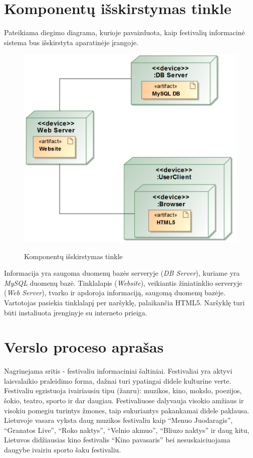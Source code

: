 ﻿\documentclass{VUMIFPSkursinis}
\begin{document}
\section{Komponentų išskirstymas tinkle}
Pateikiama diegimo diagrama, kurioje pavaizduota, kaip festivalių informacinė sistema bus išskirstyta aparatinėje įrangoje. 
\begin{figure}[H]
\centering
    \includegraphics[scale=0.5]{img/PSI3/deploy.PNG}
	\label{uml:22}
	\caption{Komponentų išskirstymas tinkle}
\end{figure}
Informacija yra saugoma duomenų bazės serveryje (\textit{DB Server}), kuriame yra \textit{MySQL} duomenų bazė. Tinklalapis (\textit{Website}), veikiantis žiniatinklio serveryje (\textit{Web Server}), tvarko ir apdoroja informaciją, saugomą duomenų bazėje. Vartotojas pasiekia tinklalapį per naršyklę, palaikančia HTML5. Naršyklę turi būti instaliuota įrenginyje su interneto prieiga.


\section{Verslo proceso aprašas}

Nagrinejama sritis - festivaliu informaciniai šaltiniai. 
Festivaliai yra aktyvi laisvalaikio praleidimo forma, dažnai turi ypatingai didele kulturine verte. 
Festivaliu egzistuoja ivairiausiu tipu (žanru): muzikos, kino, mokslo, poezijos, šokio, teatro, sporto ir dar daugiau. 
Festivaliuose dalyvauja visokio amžiaus ir visokiu pomegiu turintys žmones, taip sukuriantys pakankamai didele paklausa. 
Lietuvoje vasara vyksta daug muzikos festivaliu kaip “Menuo Juodaragis”, “Granatos Live”, “Roko naktys”, “Velnio akmuo”, “Bliuzo naktys” ir daug kitu,
 Lietuvos didžiausias kino festivalis “Kino pavasaris” bei nesuskaiciuojama daugybe ivairiu sporto šaku festivaliu.
\end{document}
